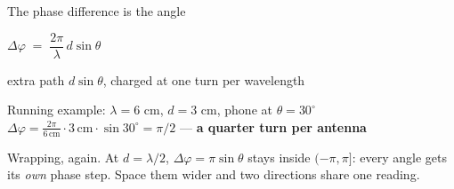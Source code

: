 \begin{frame}{The phase difference is the angle}
  \vspace{0.4em}
  \centering
  {\large $\Delta\varphi \;=\; \dfrac{2\pi}{\lambda}\, d \sin\theta$\par}
  \vspace{0.35em}
  {\small\textcolor{softgray}{extra path $d\sin\theta$, charged at one turn per
    wavelength}\par}

  \vspace{0.6em}
  \begin{tcolorbox}[colback=green!5,colframe=softgreen,boxrule=0.7pt,arc=2pt,
    left=5pt,right=5pt,top=4pt,bottom=4pt,width=0.9\textwidth]
    \small\centering
    Running example: $\lambda = 6$ cm, $d = 3$ cm, phone at $\theta = 30^\circ$
    \\[3pt]
    $\Delta\varphi = \frac{2\pi}{6\,\text{cm}} \cdot 3\,\text{cm} \cdot
     \sin 30^\circ = \pi/2$ \;---\; \textbf{a quarter turn per antenna}
  \end{tcolorbox}

  \vspace{0.5em}
     {Wrapping, again. At $d = \lambda/2$, $\Delta\varphi = \pi\sin\theta$ stays
      inside $(-\pi, \pi]$: every angle gets its \emph{own} phase step. Space
      them wider and two directions share one reading.}
\end{frame}

